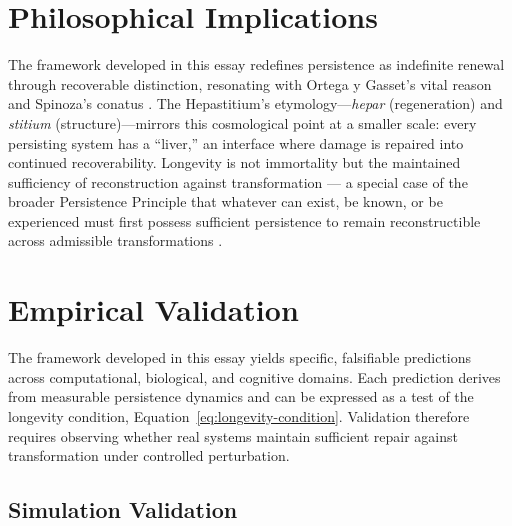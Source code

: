 \documentclass[12pt]{article}
\begin{document}
\section{Philosophical Implications}

The framework developed in this essay redefines persistence as indefinite renewal through recoverable distinction, resonating with Ortega y Gasset's vital reason and Spinoza's conatus \cite{ortegaygasset1930, spinoza1677}. The Hepastitium's etymology---\emph{hepar} (regeneration) and \emph{stitium} (structure)---mirrors this cosmological point at a smaller scale: every persisting system has a ``liver,'' an interface where damage is repaired into continued recoverability. Longevity is not immortality but the maintained sufficiency of reconstruction against transformation --- a special case of the broader Persistence Principle that whatever can exist, be known, or be experienced must first possess sufficient persistence to remain reconstructible across admissible transformations \cite{flyxion2026persistence}.

\section{Empirical Validation}
\label{sec:empirical}

The framework developed in this essay yields specific, falsifiable predictions across computational, biological, and cognitive domains. Each prediction derives from measurable persistence dynamics and can be expressed as a test of the longevity condition, Equation~\eqref{eq:longevity-condition}. Validation therefore requires observing whether real systems maintain sufficient repair against transformation under controlled perturbation.

\subsection{Simulation Validation}
\end{document}
